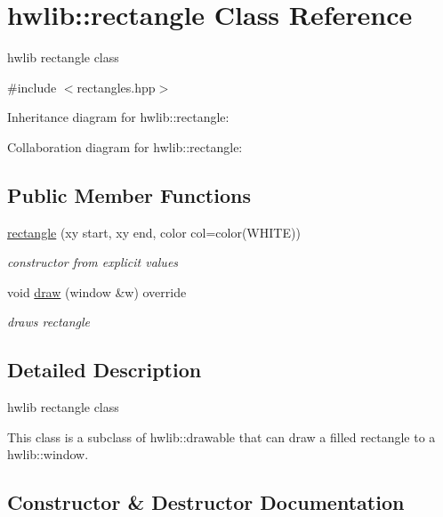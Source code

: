 \hypertarget{classhwlib_1_1rectangle}{}\section{hwlib\+:\+:rectangle Class Reference}
\label{classhwlib_1_1rectangle}


hwlib rectangle class  




{\ttfamily \#include $<$rectangles.\+hpp$>$}



Inheritance diagram for hwlib\+:\+:rectangle\+:


Collaboration diagram for hwlib\+:\+:rectangle\+:
\subsection*{Public Member Functions}
\begin{DoxyCompactItemize}
\item 
\hyperlink{classhwlib_1_1rectangle_a2c1ec58c26168557a4746fa3c09e7add}{rectangle} (xy start, xy end, color col=color(W\+H\+I\+TE))
\begin{DoxyCompactList}\small\item\em constructor from explicit values \end{DoxyCompactList}\item 
void \hyperlink{classhwlib_1_1rectangle_a5f1ca3bae86e76025891b9402edf6889}{draw} (window \&w) override
\begin{DoxyCompactList}\small\item\em draws rectangle \end{DoxyCompactList}\end{DoxyCompactItemize}


\subsection{Detailed Description}
hwlib rectangle class 

This class is a subclass of hwlib\+::drawable that can draw a filled rectangle to a hwlib\+::window. 

\subsection{Constructor \& Destructor Documentation}
\mbox{\label{classhwlib_1_1rectangle_a2c1ec58c26168557a4746fa3c09e7add}} 
